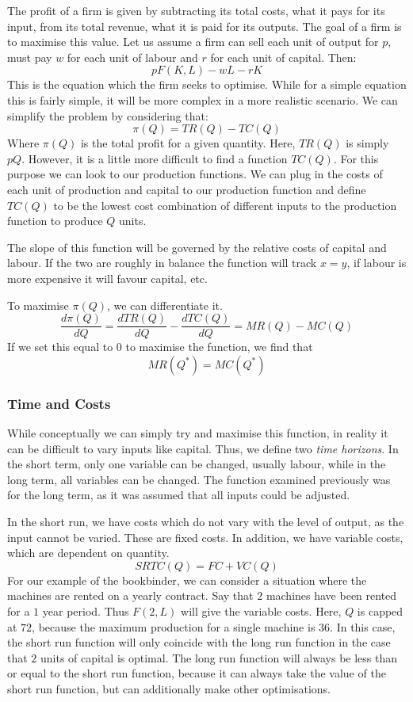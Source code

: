 \documentclass[12pt]{report}
\begin{document}
\begin{flushleft}
\bigskip
The profit of a firm is given by subtracting its total costs, what it pays for
its input, from its total revenue, what it is paid for its outputs. The goal of
a firm is to maximise this value. Let us assume a firm can sell each unit of 
output for \(p\), must pay \(w\) for each unit of labour and \(r\) for each 
unit of capital. Then:
\[pF(K, L) - wL - rK\]
This is the equation which the firm seeks to optimise. While for a simple 
equation this is fairly simple, it will be more complex in a more realistic
scenario. We can simplify the problem by considering that:
\[\pi(Q) = TR(Q) - TC(Q)\]
Where \(\pi(Q)\) is the total profit for a given quantity. Here, \(TR(Q)\) is
simply \(pQ\). However, it is a little more difficult to find a function 
\(TC(Q)\). For this purpose we can look to our production functions. We can
plug in the costs of each unit of production and capital to our production 
function and define \(TC(Q)\) to be the lowest cost combination of different
inputs to the production function to produce \(Q\) units. 

\bigskip
The slope of this function will be governed by the relative costs of capital
and labour. If the two are roughly in balance the function will track 
\(x = y\), if labour is more expensive it will favour capital, etc.

\bigskip
To maximise \(\pi(Q)\), we can differentiate it.
\[\frac{d\pi(Q)}{dQ} = \frac{dTR(Q)}{dQ} - \frac{dTC(Q)}{dQ} = MR(Q) - MC(Q)\]
If we set this equal to 0 to maximise the function, we find that
\[MR(Q^*) = MC(Q^*)\]

\subsubsection*{Time and Costs}
While conceptually we can simply try and maximise this function, in reality it
can be difficult to vary inputs like capital. Thus, we define two \textit{time 
horizons}. In the short term, only one variable can be changed, usually labour,
while in the long term, all variables can be changed. The function examined
previously was for the long term, as it was assumed that all inputs could be
adjusted.

\bigskip
In the short run, we have costs which do not vary with the level of output, as
the input cannot be varied. These are fixed costs. In addition, we have 
variable costs, which are dependent on quantity.
\[SRTC(Q) = FC + VC(Q)\]
For our example of the bookbinder, we can consider a situation where the 
machines are rented on a yearly contract. Say that \(2\) machines have been 
rented for a \(1\) year period. Thus \(F(2, L)\) will give the variable costs.
Here, \(Q\) is capped at \(72\), because the maximum production for a single
machine is \(36\). In this case, the short run function will only coincide
with the long run function in the case that \(2\) units of capital is optimal.
The long run function will always be less than or equal to the short run 
function, because it can always take the value of the short run function, but
can additionally make other optimisations.


\end{flushleft}
\end{document}
